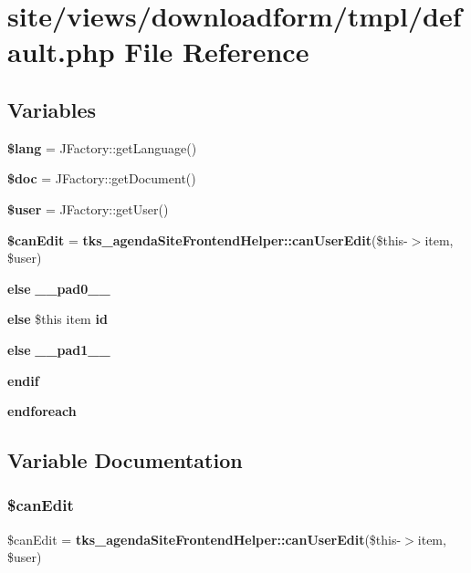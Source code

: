\section{site/views/downloadform/tmpl/default.php File Reference}
\label{site_2views_2downloadform_2tmpl_2default_8php}
\subsection*{Variables}
\begin{DoxyCompactItemize}
\item 
\textbf{ \$lang} = J\+Factory\+::get\+Language()
\item 
\textbf{ \$doc} = J\+Factory\+::get\+Document()
\item 
\textbf{ \$user} = J\+Factory\+::get\+User()
\item 
\textbf{ \$can\+Edit} = \textbf{ tks\+\_\+agenda\+Site\+Frontend\+Helper\+::can\+User\+Edit}(\$this-\/$>$item, \$user)
\item 
\textbf{ else} \textbf{ \+\_\+\+\_\+pad0\+\_\+\+\_\+}
\item 
\textbf{ else} \$this item \textbf{ id}
\item 
\textbf{ else} \textbf{ \+\_\+\+\_\+pad1\+\_\+\+\_\+}
\item 
\textbf{ endif}
\item 
\textbf{ endforeach}
\end{DoxyCompactItemize}


\subsection{Variable Documentation}
\mbox{\label{site_2views_2downloadform_2tmpl_2default_8php_aef00045e9850358b978b3a9e9075b34c}} 
\subsubsection{\$can\+Edit}
{\footnotesize\ttfamily \$can\+Edit = \textbf{ tks\+\_\+agenda\+Site\+Frontend\+Helper\+::can\+User\+Edit}(\$this-\/$>$item, \$user)}

\mbox{\label{site_2views_2downloadform_2tmpl_2default_8php_afc5e9ce512cd97cf2e0e25bb20dcd39b}} 
